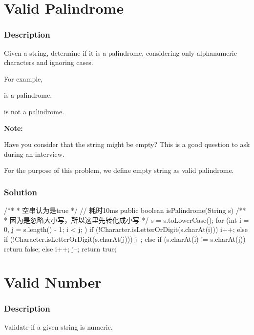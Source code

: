 \newpage

\section{Valid Palindrome} %

\subsubsection{Description}
Given a string, determine if it is a palindrome, considering only alphanumeric characters and ignoring cases.

For example,

 is a palindrome.

 is not a palindrome.

\textbf{Note:}

Have you consider that the string might be empty? This is a good question to ask during an interview.

For the purpose of this problem, we define empty string as valid palindrome.

\subsubsection{Solution}

\begin{Code}
 /**
 * 空串认为是true
 */
// 耗时10ms
public boolean isPalindrome(String s) {
    /**
     * 因为是忽略大小写，所以这里先转化成小写
     */
    s = s.toLowerCase();
    for (int i = 0, j = s.length() - 1; i < j; ) {
        if (!Character.isLetterOrDigit(s.charAt(i))) {
            i++;
        } else if (!Character.isLetterOrDigit(s.charAt(j))) {
            j--;
        } else {
            if (s.charAt(i) != s.charAt(j)) {
                return false;
            } else {
                i++;
                j--;
            }
        }
    }
    return true;
}
\end{Code}

\newpage

\section{Valid Number} %

\subsubsection{Description}
Validate if a given string is numeric.

